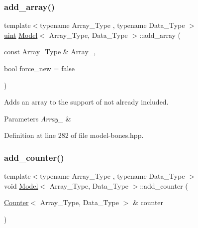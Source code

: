 \subsubsection{\texorpdfstring{add\+\_\+array()}{add\_array()}}
{\footnotesize\ttfamily template$<$typename Array\+\_\+\+Type , typename Data\+\_\+\+Type $>$ \\
\hyperlink{typedefs_8hpp_a91ad9478d81a7aaf2593e8d9c3d06a14}{uint} \hyperlink{class_model}{Model}$<$ Array\+\_\+\+Type, Data\+\_\+\+Type $>$\+::add\+\_\+array (\begin{DoxyParamCaption}\item[{const Array\+\_\+\+Type \&}]{Array\+\_\+,  }\item[{bool}]{force\+\_\+new = {\ttfamily false} }\end{DoxyParamCaption})\hspace{0.3cm}{\ttfamily [inline]}}



Adds an array to the support of not already included. 


\begin{DoxyParams}{Parameters}
{\em Array\+\_\+} & \\
\hline
\end{DoxyParams}


Definition at line 282 of file model-\/bones.\+hpp.

\mbox{\label{class_model_a1ed91acc6c747eabc8a83726c0ec7de5}} 
\subsubsection{\texorpdfstring{add\+\_\+counter()}{add\_counter()}\hspace{0.1cm}{\footnotesize\ttfamily [1/3]}}
{\footnotesize\ttfamily template$<$typename Array\+\_\+\+Type , typename Data\+\_\+\+Type $>$ \\
void \hyperlink{class_model}{Model}$<$ Array\+\_\+\+Type, Data\+\_\+\+Type $>$\+::add\+\_\+counter (\begin{DoxyParamCaption}\item[{\hyperlink{class_counter}{Counter}$<$ Array\+\_\+\+Type, Data\+\_\+\+Type $>$ \&}]{counter }\end{DoxyParamCaption})\hspace{0.3cm}{\ttfamily [inline]}}



